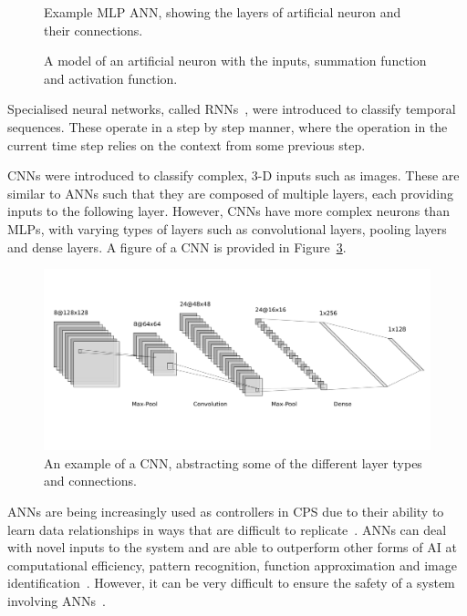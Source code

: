 \begin{figure}
	\centering
	\scalebox{0.8}{}
	\caption{Example \ac{MLP} \ac{ANN}, showing the layers of artificial neuron and their connections.	\label{fig:mlp-ann}}
\end{figure}
\begin{figure}
	\centering
	\scalebox{0.8}{}
	\caption{A model of an artificial neuron with the inputs, summation function and activation function. \label{fig:artificial-neuron}}
\end{figure}

Specialised neural networks, called \acfp{RNN}~\cite{medsker2001recurrent}, were introduced to classify temporal sequences. 
These operate in a step by step manner, where the operation in the current time step relies on the context from some previous step.

\acp{CNN} were introduced to classify complex, 3-D inputs such as images.
These are similar to \acp{ANN} such that they are composed of multiple layers, each providing inputs to the following layer. 
However, \acp{CNN} have more complex neurons than \acp{MLP}, with varying types of layers such as convolutional layers, pooling layers and dense layers.
A figure of a \ac{CNN} is provided in Figure~\ref{fig:cnn}.

\begin{figure}
	\centering
	\includegraphics[width=\textwidth]{Content/fig/cnn-img.pdf}
	\caption{An example of a \ac{CNN}, abstracting some of the different layer types and connections. \label{fig:cnn}}
\end{figure}

\acp{ANN} are being increasingly used as controllers in \ac{CPS} due to their ability to learn data relationships in ways that are difficult to replicate~\cite{ANNSafety2007}. 
\acp{ANN} can deal with novel inputs to the system and are able to outperform other forms of \ac{AI} at computational efficiency, pattern recognition, function approximation and image identification~\cite{AIComp2016, AIComp2017}. 
However, it can be very difficult to ensure the safety of a system involving \acp{ANN}~\cite{ANNSafety2007, ANNSafety2018}.

